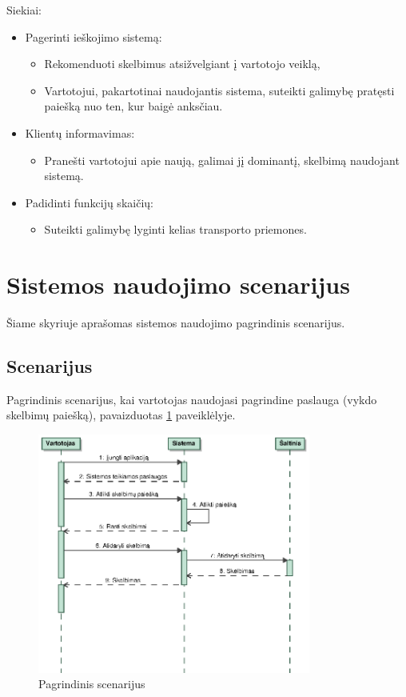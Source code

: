 \documentclass[12pt]{article}
\begin{document}
	Siekiai:
	\begin{itemize}
		\item{Pagerinti ieškojimo sistemą:}
		\begin{itemize}
			\item{Rekomenduoti skelbimus atsižvelgiant į vartotojo veiklą,}
			\item{Vartotojui, pakartotinai naudojantis sistema, suteikti galimybę pratęsti paiešką nuo ten, kur baigė anksčiau.}
		\end{itemize}
		\item{Klientų informavimas:}
		\begin{itemize}
			\item{Pranešti vartotojui apie naują, galimai jį dominantį, skelbimą naudojant sistemą.}
		\end{itemize}
		\item{Padidinti funkcijų skaičių:}
		\begin{itemize}
			\item{Suteikti galimybę lyginti kelias transporto priemones.}
		\end{itemize}
	\end{itemize}
	\pagebreak
	
	\section{Sistemos naudojimo scenarijus}
	Šiame skyriuje aprašomas sistemos naudojimo pagrindinis scenarijus.
	
	\subsection{Scenarijus}
	Pagrindinis scenarijus, kai vartotojas naudojasi pagrindine paslauga (vykdo skelbimų paiešką), pavaizduotas \ref{Scenario} paveiklėlyje.
	
	\begin{figure}[h]
		\begin{center}
			\includegraphics[width=0.8\textwidth]{Scenarijus.eps}
			\caption{Pagrindinis scenarijus\label{Scenario}}
		\end{center}
	\end{figure}
	
\end{document}
